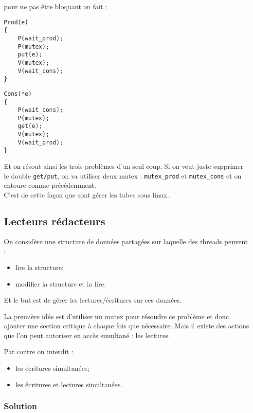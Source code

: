\documentclass[12pt,a4paper]{report}
\begin{document}
\medskip

pour ne pas être bloquant on fait :

\medskip

\begin{minipage}{0.5\linewidth}
\begin{verbatim}
Prod(e)
{
    P(wait_prod);
    P(mutex);
    put(e);
    V(mutex);
    V(wait_cons);
}
\end{verbatim}
\end{minipage}
\begin{minipage}{0.5\linewidth}
\begin{verbatim}
Cons(*e)
{
    P(wait_cons);
    P(mutex); 
    get(e);
    V(mutex);
    V(wait_prod);
}
\end{verbatim}
\end{minipage}

\medskip

Et on résout ainsi les trois problèmes d'un seul coup. Si on veut juste supprimer le double \verb?get/put?, on va utiliser deux mutex : \verb?mutex_prod? et \verb?mutex_cons? et on entoure comme précédemment.\\
C'est de cette façon que sont gérer les tubes sous linux.


\subsection{Lecteurs rédacteurs}

On considère une structure de données partagées sur laquelle des threads peuvent :
\begin{itemize}
\item lire la structure;
\item modifier la structure et la lire.
\end{itemize}
Et le but est de gérer les lectures/écritures sur ces données.

\medskip

La première idée est d'utiliser un mutex pour résoudre ce problème et donc ajouter une section critique à chaque fois que nécessaire.
Mais il existe des actions que l'on peut autoriser en accès simultané : les lectures.

Par contre on interdit :
\begin{itemize}
\item les écritures simultanées;
\item les écritures et lectures simultanées.
\end{itemize}

\subsubsection{Solution}
\label{sec:solution}
\end{document}
